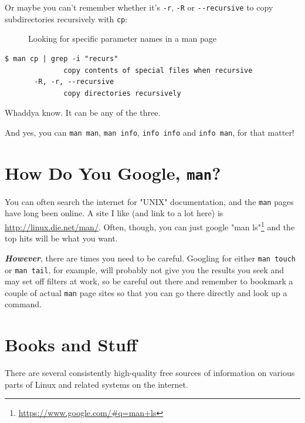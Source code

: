 \documentclass[10pt,]{book}
\renewcommand{\href}[2]{#2\footnote{\url{#1}}}
\numberwithin{figure}{chapter}
\DeclareRobustCommand{\drcap}[1]{\begin{figure}[H]\caption{#1}\end{figure}}
\DeclareRobustCommand{\drcmd}[1]{\index{Commands!#1}}
\begin{document}
Or maybe you can't remember whether it's \texttt{-r}, \texttt{-R} or
\texttt{-{}-recursive} to copy subdirectories recursively with
\texttt{cp}\drcmd{cp}:

\drcap{Looking for specific parameter names in a man page}

\begin{verbatim}
$ man cp | grep -i "recurs"
              copy contents of special files when recursive
       -R, -r, --recursive
              copy directories recursively
\end{verbatim}

Whaddya know. It can be any of the three.

And yes, you can \texttt{man man}, \texttt{man info}, \texttt{info info}
and \texttt{info man}, for that matter!

\section*{How Do You Google, \texttt{man}?}\label{how-do-you-google-man}

You can often search the internet for "UNIX" documentation, and the
\texttt{man} pages have long been online. A site I like (and link to a
lot here) is \url{http://linux.die.net/man/}. Often, though, you can
just google \href{https://www.google.com/\#q=man+ls}{"man ls"} and the
top hits will be what you want.

\textbf{\emph{However}}, there are times you need to be careful.
Googling for either \texttt{man touch} or \texttt{man tail}, for
example, will probably not give you the results you seek and may set off
filters at work, so be careful out there and remember to bookmark a
couple of actual \texttt{man} page sites so that you can go there
directly and look up a command.

\section*{Books and Stuff}\label{books-and-stuff}

There are several consistently high-quality free sources of information
on various parts of Linux and related systems on the internet.
\end{document}
